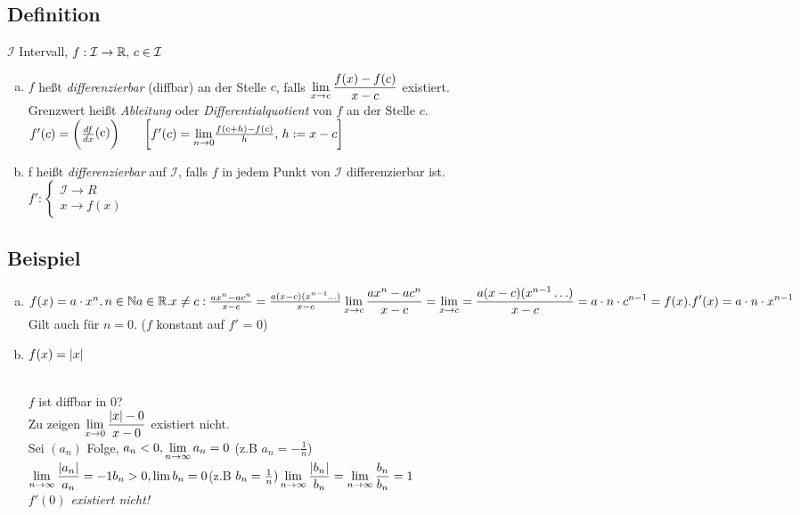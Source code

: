 \subsection{Definition}
$\mathcal{I}$ Intervall, $f: \mathcal{I} \to \mathbb{R} ,\, c \in \mathcal{I}$
\begin{enumerate}[a)]
\item $f$ he\ss t {\em differenzierbar} (diffbar) an der Stelle $c$, falls $\displaystyle \lim_{x \to c} \frac{f(x)-f(c)}{x-c}$ existiert.\\
Grenzwert hei\ss t \emph{Ableitung} oder \emph{Differentialquotient} von $f$ an der Stelle $c$.\\
$f'(c) = \biggl( \frac{df}{dx} \raisebox{1pt}{(c)} \biggr) \qquad
\biggl\lbrack f'(c) = {\displaystyle \lim_{n \to 0}} \frac{f(c+h) -f(c)}{h},\, h := x-c \biggr\rbrack$
\item f hei\ss t \emph{differenzierbar} auf $\mathcal{I}$, falls $f$ in jedem Punkt von $\mathcal{I}$ differenzierbar ist.\\
$f' :\begin{cases}
\mathcal{I} \to R\\
x \to f(x)
\end{cases}$
\end{enumerate}
\subsection{Beispiel}\label{sec:6.2}
\begin{enumerate}[a)]
\item $f(x) = a \cdot x^n , n \in \mathbb{N} a \in \mathbb{R}.\\
x \neq c: \frac{ax^n-ac^n}{x-c} = \frac{a(x-c)(x^{n-1}\ldots)}{x-c}\\
\displaystyle \lim_{x \to c} \frac{ax^n-ac^n}{x-c} = \displaystyle \lim_{x \to c} = \frac{a(x-c)(x^{n-1}\ldots)}{x-c} = a \cdot n \cdot c^{n-1} = f(x).\\
f'(x) = a \cdot n \cdot x^{n-1}$ Gilt auch für $n=0$. ($f$ konstant auf $f'$ = 0)
\item $f(x) = \lvert x \rvert$\\
\\
$f$ ist diffbar in 0?\\
Zu zeigen $\displaystyle \lim_{x \to 0} \frac{\lvert x \rvert-0}{x-0}$ existiert nicht. \\
Sei $(a_n)$ Folge, $a_n < 0 , \displaystyle \lim_{n \to \infty} a_n = 0$ (z.B $a_n = -\frac{1}{n}$)\\
$\displaystyle \lim_{n \to \infty} \frac{\lvert a_n \rvert}{a_n} = -1\\
b_n > 0 , \lim b_n = 0 $(z.B $b_n = \frac{1}{n})\\
\displaystyle \lim_{n \to \infty} \frac{\lvert b_n \rvert}{b_n} = \displaystyle \lim_{n \to \infty} \frac{b_n}{b_n} =1$\\
{\em $f'(0)$ existiert nicht!}
\end{enumerate}
